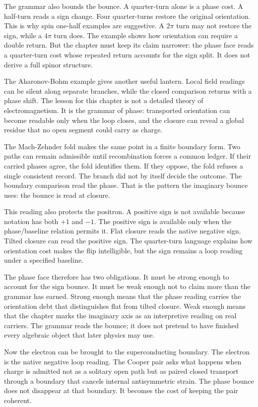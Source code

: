 The grammar also bounds the bounce. A quarter-turn alone is a phase cost. A
half-turn reads a sign change. Four quarter-turns restore the original
orientation. This is why spin one-half examples are suggestive. A \(2\pi\)
turn may not restore the sign, while a \(4\pi\) turn does. The example shows
how orientation can require a double return. But the chapter must keep its
claim narrower: the phase face reads a quarter-turn cost whose repeated
return accounts for the sign split. It does not derive a full spinor
structure.

The Aharonov-Bohm example gives another useful lantern. Local field readings
can be silent along separate branches, while the closed comparison returns
with a phase shift. The lesson for this chapter is not a detailed theory of
electromagnetism. It is the grammar of phase: transported orientation can
become readable only when the loop closes, and the closure can reveal a
global residue that no open segment could carry as charge.

The Mach-Zehnder fold makes the same point in a finite boundary form. Two
paths can remain admissible until recombination forces a common ledger. If
their carried phases agree, the fold identifies them. If they oppose, the
fold refuses a single consistent record. The branch did not by itself decide
the outcome. The boundary comparison read the phase. That is the pattern the
imaginary bounce uses: the bounce is read at closure.

This reading also protects the positron. A positive sign is not available
because notation has both \(+1\) and \(-1\). The positive sign is available
only when the phase/baseline relation permits it. Flat closure reads the
native negative sign. Tilted closure can read the positive sign. The
quarter-turn language explains how orientation cost makes the flip
intelligible, but the sign remains a loop reading under a specified baseline.

The phase face therefore has two obligations. It must be strong enough to
account for the sign bounce. It must be weak enough not to claim more than
the grammar has earned. Strong enough means that the phase reading carries
the orientation debt that distinguishes flat from tilted closure. Weak
enough means that the chapter marks the imaginary axis as an interpretive
reading on real carriers. The grammar reads the bounce; it does not pretend
to have finished every algebraic object that later physics may use.

Now the electron can be brought to the superconducting boundary. The
electron is the native negative loop reading. The Cooper pair asks what
happens when charge is admitted not as a solitary open path but as paired
closed transport through a boundary that cancels internal antisymmetric
strain. The phase bounce does not disappear at that boundary. It becomes the
cost of keeping the pair coherent.

